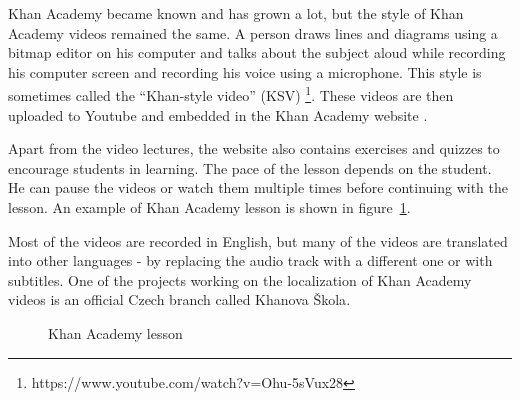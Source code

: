 Khan Academy became known and has grown a lot, but the style of Khan Academy videos remained the same. A person draws lines and diagrams using a bitmap editor on his computer and talks about the subject aloud while recording his computer screen and recording his voice using a microphone. This style is sometimes called the ``Khan-style video'' (KSV) \footnote{https://www.youtube.com/watch?v=Ohu-5sVux28}. These videos are then uploaded to Youtube and embedded in the Khan Academy website \cite{khan_academy}.

Apart from the video lectures, the website also contains exercises and quizzes to encourage students in learning. The pace of the lesson depends on the student. He can pause the videos or watch them multiple times before continuing with the lesson. An example of Khan Academy lesson is shown in figure~\ref{fig:khan-screen}.

Most of the videos are recorded in English, but many of the videos are translated into other languages - by replacing the audio track with a different one or with subtitles. One of the projects working on the localization of Khan Academy videos is an official Czech branch called Khanova Škola\cite{khanova_skola}.

\begin{figure}
	\centering
	\caption{Khan Academy lesson}
	\label{fig:khan-screen}
\end{figure}
